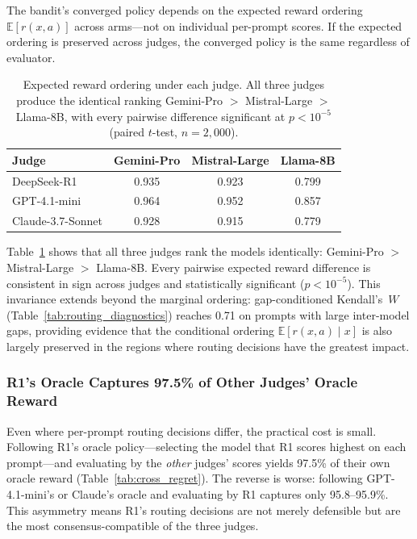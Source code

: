 The bandit's converged policy depends on the expected reward ordering
$\mathbb{E}[r(x, a)]$ across arms---not on individual per-prompt scores.
If the expected ordering is preserved across judges, the converged policy
is the same regardless of evaluator.

\begin{table}[h]
\centering
\caption{Expected reward ordering under each judge.  All three judges
produce the identical ranking Gemini-Pro $>$ Mistral-Large $>$ Llama-8B,
with every pairwise difference significant at $p < 10^{-5}$ (paired
$t$-test, $n = 2{,}000$).}
\label{tab:expected_ordering}
\small
\begin{tabular}{lccc}
\toprule
\textbf{Judge} & \textbf{Gemini-Pro} & \textbf{Mistral-Large} & \textbf{Llama-8B} \\
\midrule
DeepSeek-R1       & 0.935 & 0.923 & 0.799 \\
GPT-4.1-mini      & 0.964 & 0.952 & 0.857 \\
Claude-3.7-Sonnet & 0.928 & 0.915 & 0.779 \\
\bottomrule
\end{tabular}
\end{table}

Table~\ref{tab:expected_ordering} shows that all three judges rank
the models identically: Gemini-Pro $>$ Mistral-Large $>$ Llama-8B.
Every pairwise expected reward difference is consistent in sign across
judges and statistically significant ($p < 10^{-5}$).  This invariance
extends beyond the marginal ordering: gap-conditioned Kendall's~$W$
(Table~\ref{tab:routing_diagnostics}) reaches 0.71 on prompts with large
inter-model gaps, providing evidence that the conditional ordering
$\mathbb{E}[r(x,a) \mid x]$ is also largely preserved in the regions
where routing decisions have the greatest impact.

\subsubsection{R1's Oracle Captures 97.5\% of Other Judges' Oracle Reward}

Even where per-prompt routing decisions differ, the practical cost is
small.  Following R1's oracle policy---selecting the model that R1 scores
highest on each prompt---and evaluating by the \emph{other} judges'
scores yields 97.5\% of their own oracle reward
(Table~\ref{tab:cross_regret}).  The reverse is worse: following
GPT-4.1-mini's or Claude's oracle and evaluating by R1 captures only
95.8--95.9\%.  This asymmetry means R1's routing decisions are not merely
defensible but are the most consensus-compatible of the three judges.


